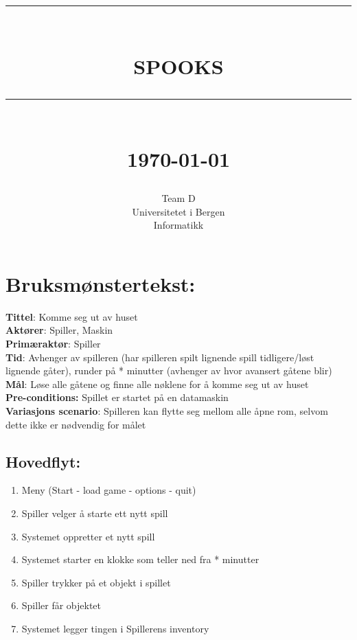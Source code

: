 \documentclass[12pt]{report}
\newcommand{\HRule}[1]{\rule{\linewidth}{#1}}
\begin{document}
\title{ \normalsize \textsc{}
		\\ [2.0cm]
		\HRule{0.5pt} \\
		\LARGE \textbf{\uppercase{Spooks}}
		\HRule{2pt} \\ [0.5cm]
		\normalsize \today \vspace*{5\baselineskip}}

\date{}

\author{
		Team D  \\ 
		Universitetet i Bergen \\
		Informatikk }

\maketitle
\tableofcontents
\newpage


\section*{Bruksm{\o}nstertekst:}
\textbf{Tittel}: Komme seg ut av huset
\bigskip \\
\textbf{Akt{\o}rer}: Spiller, Maskin 
\bigskip \\
\textbf{Prim{\ae}rakt{\o}r}: Spiller
\bigskip \\
\textbf{Tid}: Avhenger av spilleren (har spilleren spilt lignende spill tidligere/l{\o}st lignende g{\aa}ter), runder p{\aa} * minutter (avhenger av hvor avansert g{\aa}tene blir)
\bigskip \\
\textbf{M{\aa}l}: L{\o}se alle g{\aa}tene og finne alle n{\o}klene for {\aa} komme seg ut av huset
\bigskip \\
\textbf{Pre-conditions:} Spillet er startet p{\aa} en datamaskin
\bigskip \\
\textbf{Variasjons scenario}: Spilleren kan flytte seg mellom alle {\aa}pne rom, selvom dette ikke er n{\o}dvendig for m{\aa}let

\subsection*{Hovedflyt:}

\begin{enumerate}
\item Meny (Start - load game - options - quit)
\item Spiller velger {\aa} starte ett nytt spill
\item Systemet oppretter et nytt spill
\item Systemet starter en klokke som teller ned fra * minutter
\item Spiller trykker p{\aa} et objekt i spillet
\item Spiller f{\aa}r objektet
\item Systemet legger tingen i Spillerens inventory
\end{enumerate}
\end{document}
